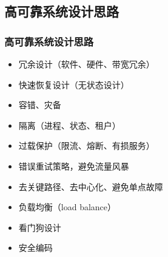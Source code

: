 \subsection{高可靠系统设计思路} %
\begin{frame}[fragile]
    \frametitle{高可靠系统设计思路}
\begin{itemize}
    \item 冗余设计（软件、硬件、带宽冗余）
    \item 快速恢复设计（无状态设计）
    \item 容错、灾备
    \item 隔离（进程、状态、租户）
    \item 过载保护（限流、熔断、有损服务）
    \item 错误重试策略，避免流量风暴
    \item 去关键路径、去中心化、避免单点故障
    \item 负载均衡（load balance）
    \item 看门狗设计
    \item 安全编码
\end{itemize} 
\end{frame}




























